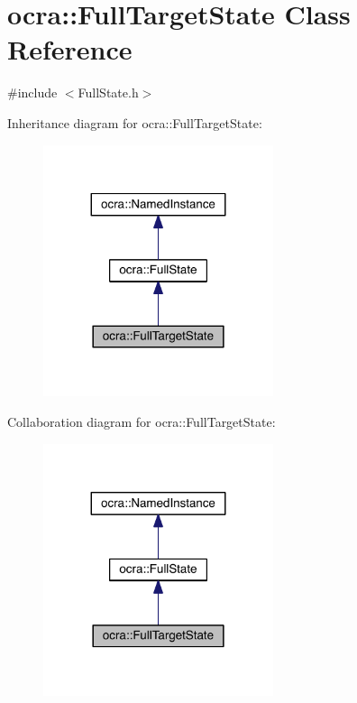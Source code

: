 \hypertarget{classocra_1_1FullTargetState}{}\section{ocra\+:\+:Full\+Target\+State Class Reference}
\label{classocra_1_1FullTargetState}


{\ttfamily \#include $<$Full\+State.\+h$>$}



Inheritance diagram for ocra\+:\+:Full\+Target\+State\+:\nopagebreak
\begin{figure}[H]
\begin{center}
\leavevmode
\includegraphics[width=191pt]{d7/d42/classocra_1_1FullTargetState__inherit__graph}
\end{center}
\end{figure}


Collaboration diagram for ocra\+:\+:Full\+Target\+State\+:\nopagebreak
\begin{figure}[H]
\begin{center}
\leavevmode
\includegraphics[width=191pt]{de/df8/classocra_1_1FullTargetState__coll__graph}
\end{center}
\end{figure}
